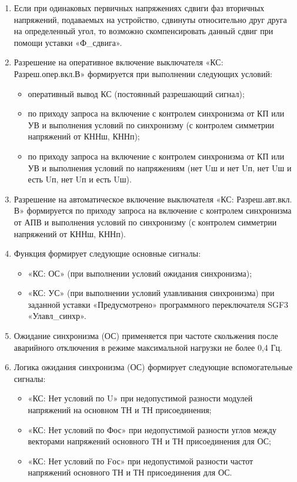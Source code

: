 \begin{enumerate}
\item
Если при одинаковых первичных напряжениях сдвиги фаз вторичных напряжений, подаваемых на устройство, сдвинуты относительно друг друга на определенный угол, то возможно скомпенсировать данный сдвиг при помощи уставки «Ф\_сдвига».

\item
Разрешение на оперативное включение выключателя «КС: Разреш.опер.вкл.В» формируется при выполнении следующих условий:
\begin{itemize}
    \item оперативный вывод КС (постоянный разрешающий сигнал);
    \item по приходу запроса на включение с контролем синхронизма от КП или УВ и выполнения условий по синхронизму (с контролем симметрии напряжений от КННш, КННп);
    \item по приходу запроса на включение с контролем синхронизма от КП или УВ и выполнения условий по напряжениям (нет Uш и нет Uп, нет Uш и есть Uп, нет Uп и есть Uш).
\end{itemize}

\item
Разрешение на автоматическое включение выключателя «КС: Разреш.авт.вкл. В» формируется по приходу запроса на включение с контролем синхронизма от АПВ и выполнения условий по синхронизму (с контролем симметрии напряжений от КННш, КННп).

\item Функция формирует следующие основные сигналы:
\begin{itemize}
    \item «КС: ОС» (при выполнении условий ожидания синхронизма);
    \item «КС: УС» (при выполнении условий улавливания синхронизма) при заданной уставки «Предусмотрено» программного переключателя SGF3 «Улавл\_синхр».
\end{itemize}

\item
Ожидание синхронизма (ОС) применяется при частоте скольжения после аварийного отключения в режиме максимальной нагрузки не более 0,4 Гц.

\item Логика ожидания синхронизма (ОС) формирует следующие вспомогательные сигналы:
\begin{itemize}
    \item «КС: Нет условий по U» при недопустимой разности модулей напряжений на основном ТН и ТН присоединения;
    \item «КС: Нет условий по Фос» при недопустимой разности углов между векторами напряжений основного ТН и ТН присоединения для ОС;
    \item «КС: Нет условий по Fос» при недопустимой разности частот напряжений основного ТН и ТН присоединения для ОС.
\end{itemize}   


\end{enumerate}
